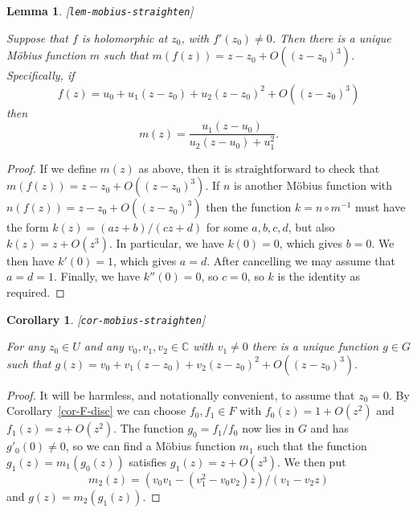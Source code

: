 \documentclass[reqno]{amsart}
\newcommand{\lbl}[1]{\label{#1}\textup{[\texttt{#1}]}\par}
\newcommand{\lbl}{\label}
\newcommand{\C}         {{\mathbb{C}}}
\renewcommand{\:}{\colon}
\newtheorem{lemma}[theorem]{Lemma}
\newtheorem{corollary}[theorem]{Corollary}
\theoremstyle{definition}
\begin{document}
\begin{lemma}\lbl{lem-mobius-straighten}
 Suppose that $f$ is holomorphic at $z_0$, with $f'(z_0)\neq 0$.  Then
 there is a unique M\"obius function $m$ such that
 $m(f(z))=z-z_0+O((z-z_0)^3)$.  Specifically, if
 \[ f(z) = u_0 + u_1(z-z_0) + u_2(z-z_0)^2 + O((z-z_0)^3) \]
 then
 \[ m(z) = \frac{u_1(z-u_0)}{u_2(z-u_0)+u_1^2}. \]
\end{lemma}
\begin{proof}
 If we define $m(z)$ as above, then it is straightforward to check
 that $m(f(z))=z-z_0+O((z-z_0)^3)$.  If $n$ is another M\"obius
 function with $n(f(z))=z-z_0+O((z-z_0)^3)$ then the function
 $k=n\circ m^{-1}$ must have the form $k(z)=(az+b)/(cz+d)$ for some
 $a,b,c,d$, but also $k(z)=z+O(z^3)$.  In particular, we have
 $k(0)=0$, which gives $b=0$.  We then have $k'(0)=1$, which gives
 $a=d$.  After cancelling we may assume that $a=d=1$.  Finally, we
 have $k''(0)=0$, so $c=0$, so $k$ is the identity as required.
\end{proof}

\begin{corollary}\lbl{cor-mobius-straighten}
 For any $z_0\in U$ and any $v_0,v_1,v_2\in\C$ with $v_1\neq 0$ there
 is a unique function $g\in G$ such that
 $g(z)=v_0+v_1(z-z_0)+v_2(z-z_0)^2+O((z-z_0)^3)$.
\end{corollary}
\begin{proof}
 It will be harmless, and notationally convenient, to assume that
 $z_0=0$.  By Corollary~\ref{cor-F-disc} we can choose
 $f_0,f_1\in F$ with $f_0(z)=1+O(z^2)$ and $f_1(z)=z+O(z^2)$.  The
 function $g_0=f_1/f_0$ now lies in $G$ and has $g'_0(0)\neq 0$, so we
 can find a M\"obius function $m_1$ such that the function
 $g_1(z)=m_1(g_0(z))$ satisfies $g_1(z)=z+O(z^3)$.  We then put
 \[ m_2(z)=(v_0v_1-(v_1^2-v_0v_2)z)/(v_1-v_2z) \]
 and $g(z)=m_2(g_1(z))$.
\end{proof}
\end{document}

